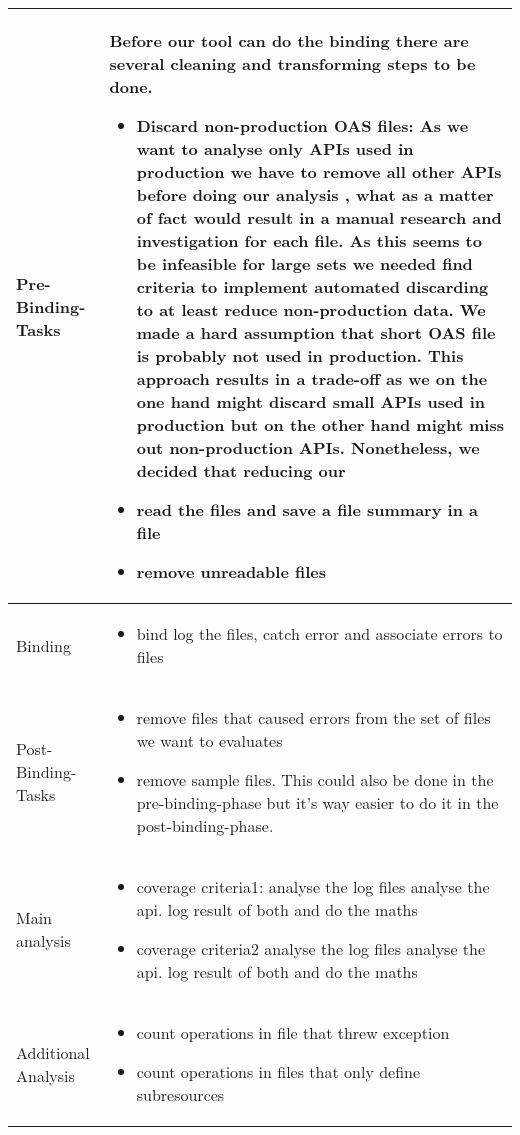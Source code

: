 \begin{longtable}{ m{3cm} | m{11.5cm}}
\bottomrule
\endlastfoot
Pre-Binding-Tasks &
Before our tool can do the binding there are several cleaning and transforming steps to be done. 
\begin{itemize}
    \item \textbf {Discard non-production OAS files:} As we want to analyse only APIs used in production we have to remove all other APIs before doing our analysis , what as a matter of fact would result in a manual research and investigation for each file. As this seems to be infeasible for large sets we needed find criteria to implement automated discarding to at least reduce non-production data. We made a hard assumption that short OAS file is probably not used in production. This approach results in a trade-off as we on the one hand might discard small APIs used in production but on the other hand might miss out non-production APIs. Nonetheless, we decided that reducing our    
    \item read the files and save a file summary in a file
    \item remove unreadable files
\end{itemize} 
\\
\hline
Binding &
\begin{itemize}
    \item bind log the files, catch error and associate errors to files
\end{itemize} 
\\
\hline
Post-Binding-Tasks &
\begin{itemize}
    \item remove files that caused errors from the set of files we want to evaluates
    \item remove sample files. This could also be done in the pre-binding-phase but it's way easier to do it in the post-binding-phase.
\end{itemize} 
\\
\hline
Main analysis &
\begin{itemize}
    \item coverage criteria1: analyse the log files analyse the api. log result of both and do the maths
    \item coverage criteria2 analyse the log files analyse the api. log result of both and do the maths
\end{itemize}
\\ 
\hline
Additional Analysis & 
\begin{itemize}
    \item count operations in file that threw exception 
    \item count operations in files that only define subresources
\end{itemize} 
\\
\end{longtable}